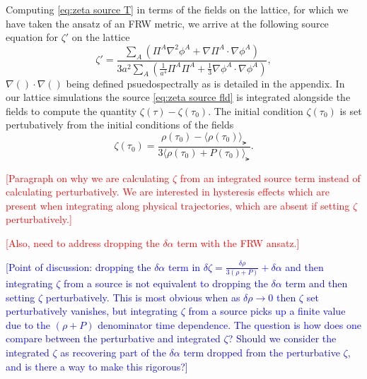Computing \eqref{eq:zeta source T} in terms of the fields on the lattice, for which we have taken the ansatz of an FRW metric, we arrive at the following source equation for $\zeta'$ on the lattice
\begin{equation} \label{eq:zeta source fld}
  \zeta' = \frac{\sum_A\left(\Pi^A\nabla^2\phi^A + \nabla\Pi^A\cdot\nabla\phi^A\right)}{3a^2\sum_A\left(\frac{1}{a^4}\Pi^A\Pi^A + \frac{1}{3}\nabla\phi^A\cdot\nabla\phi^A \right)},
\end{equation}
$\nabla()\cdot\nabla()$ being defined psuedospectrally as is detailed in the appendix.
In our lattice simulations the source \eqref{eq:zeta source fld} is integrated alongside the fields to compute the quantity $\zeta(\tau) - \zeta(\tau_0)$.
The initial condition $\zeta(\tau_0)$ is set pertubatively from the initial conditions of the fields
\begin{equation}
  \zeta(\tau_0) = \frac{\rho(\tau_0)-\langle\rho(\tau_0)\rangle_\lat}{3\langle\rho(\tau_0)+P(\tau_0)\rangle_\lat}.
\end{equation}

\textcolor{red}{[Paragraph on why we are calculating $\zeta$ from an integrated source term instead of calculating perturbatively. We are interested in hysteresis effects which are present when integrating along physical trajectories, which are absent if setting $\zeta$ perturbatively.]}

\textcolor{red}{[Also, need to address dropping the $\delta\alpha$ term with the FRW ansatz.]}

\textcolor{blue}{[Point of discussion: dropping the $\delta\alpha$ term in $\delta\zeta = \frac{\delta\rho}{3(\rho + P)} + \delta\alpha$ and then integrating $\zeta$ from a source is not equivalent to dropping the $\delta\alpha$ term and then setting $\zeta$ perturbatively. This is most obvious when as $\delta\rho \to 0$ then $\zeta$ set perturbatively vanishes, but integrating $\zeta$ from a source picks up a finite value due to the $(\rho+P)$ denominator time dependence.
    The question is how does one compare between the perturbative and integrated $\zeta$? Should we consider the integrated $\zeta$ as recovering part of the $\delta\alpha$ term dropped from the perturbative $\zeta$, and is there a way to make this rigorous?]}



